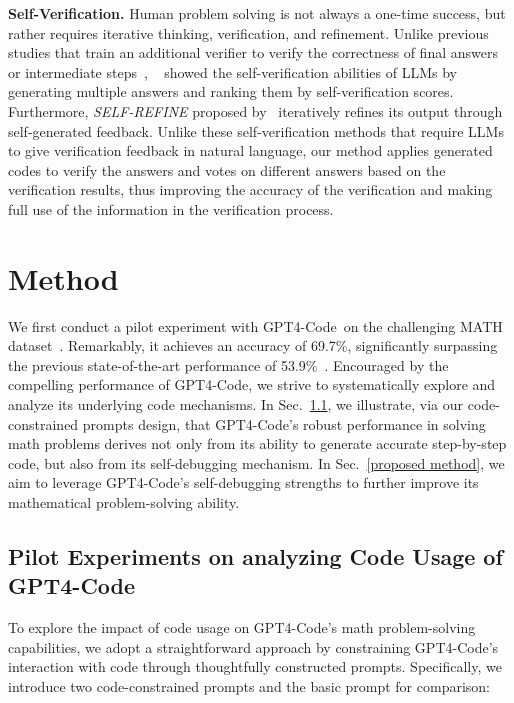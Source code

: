 \documentclass{article} \usepackage{iclr2023_conference,times}
\newcommand{\gptcode}{GPT4-Code}
\begin{document}
\textbf{Self-Verification.} 
Human problem solving is not always a one-time success, but rather requires iterative thinking, verification, and refinement. Unlike previous studies that train an additional verifier to verify the correctness of final answers~\citep{cobbe2021gsm8k} or intermediate steps~\citep{lightman2023lets, li2023making}, ~\citet{weng2023large} showed the self-verification abilities of LLMs by generating multiple answers and ranking them by self-verification scores. Furthermore, \textit{SELF-REFINE} proposed by~\citet{madaan2023self} iteratively refines its output through self-generated feedback. Unlike these self-verification methods that require LLMs to give verification feedback in natural language, our method applies generated codes to verify the answers and votes on different answers based on the verification results, thus improving the accuracy of the verification and making full use of the information in the verification process.


\section{Method}

We first conduct a pilot experiment with \gptcode ~on the challenging MATH dataset~\citep{hendrycks2021measuring}. Remarkably, it achieves an accuracy of 69.7\%, significantly 
surpassing the previous state-of-the-art performance of 53.9\%~\citep{zheng2023progressive}. Encouraged by the compelling performance of \gptcode, we strive to systematically explore and analyze its underlying code mechanisms. In Sec.~\ref{pilot-experiments}, we illustrate, via our code-constrained prompts design, that \gptcode's robust performance in solving 
math problems derives not only from its ability to generate accurate step-by-step code, but also from its self-debugging mechanism. In Sec.~\ref{proposed method}, we aim to leverage \gptcode's self-debugging strengths to further improve its mathematical problem-solving ability.
 





\subsection{Pilot Experiments on analyzing Code Usage of \gptcode}
\label{pilot-experiments}



To explore the impact of code usage on \gptcode 's math problem-solving capabilities, we adopt a straightforward approach by constraining \gptcode's interaction with code through thoughtfully constructed prompts. Specifically, we introduce two code-constrained prompts and the basic prompt for comparison:
\end{document}
